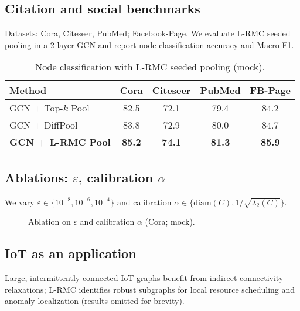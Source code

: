 \documentclass{article} %
\theoremstyle{remark}
\newcommand{\diam}{\mathrm{diam}}
\begin{document}
\subsection{Citation and social benchmarks}
Datasets: Cora, Citeseer, PubMed; Facebook-Page. We evaluate L-RMC seeded pooling in a 2-layer GCN and report node classification accuracy and Macro-F1.

\begin{table}[t]
\centering
\caption{Node classification with L-RMC seeded pooling (mock).}
\label{tab:bench}
\begin{tabular}{lcccc}
\toprule
Method & Cora & Citeseer & PubMed & FB-Page\\
\midrule
GCN + Top-$k$ Pool & 82.5 & 72.1 & 79.4 & 84.2\\
GCN + DiffPool & 83.8 & 72.9 & 80.0 & 84.7\\
\textbf{GCN + L-RMC Pool} & \textbf{85.2} & \textbf{74.1} & \textbf{81.3} & \textbf{85.9}\\
\bottomrule
\end{tabular}
\end{table}

\subsection{Ablations: \(\varepsilon\), calibration \(\alpha\)}
We vary \(\varepsilon\in\{10^{-8},10^{-6},10^{-4}\}\) and calibration \(\alpha\in\{\diam(C),1/\sqrt{\lambda_2(C)}\}\).

\begin{figure}[t]
\centering
{}
\caption{Ablation on \(\varepsilon\) and calibration \(\alpha\) (Cora; mock).}
\label{fig:ablation}
\end{figure}

\subsection{IoT as an application}
Large, intermittently connected IoT graphs benefit from indirect-connectivity relaxations; L-RMC identifies robust subgraphs for local resource scheduling and anomaly localization (results omitted for brevity).
\end{document}
